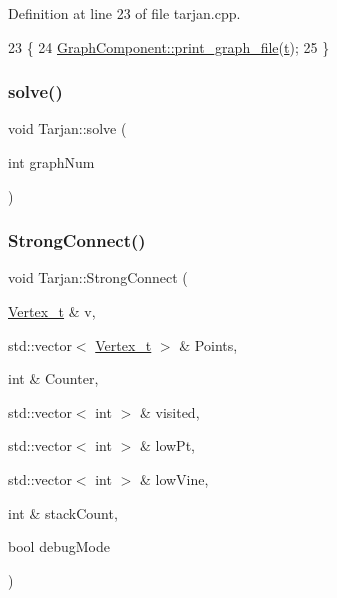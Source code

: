 Definition at line 23 of file tarjan.\+cpp.


\begin{DoxyCode}
23                         \{
24     \hyperlink{class_graph_component_a6af293dac3774fde0e2822b5725ecacd}{GraphComponent::print\_graph\_file}(\hyperlink{class_tarjan_a54b0703f885a3514ea0bf4cdbc7fdaad}{t});
25 \}
\end{DoxyCode}
\mbox{\label{class_tarjan_af94d48b6e78c292bd1aa465d37d89769}} 
\subsubsection{\texorpdfstring{solve()}{solve()}}
{\footnotesize\ttfamily void Tarjan\+::solve (\begin{DoxyParamCaption}\item[{int}]{graph\+Num }\end{DoxyParamCaption})}

\mbox{\label{class_tarjan_ac76fd1419a2de2dbf34c6ff1d4cc55e2}} 
\subsubsection{\texorpdfstring{Strong\+Connect()}{StrongConnect()}}
{\footnotesize\ttfamily void Tarjan\+::\+Strong\+Connect (\begin{DoxyParamCaption}\item[{\hyperlink{class_graph_component_ae67114a6ce5a001dc35e1996e1b45aa0}{Vertex\+\_\+t} \&}]{v,  }\item[{std\+::vector$<$ \hyperlink{class_graph_component_ae67114a6ce5a001dc35e1996e1b45aa0}{Vertex\+\_\+t} $>$ \&}]{Points,  }\item[{int \&}]{Counter,  }\item[{std\+::vector$<$ int $>$ \&}]{visited,  }\item[{std\+::vector$<$ int $>$ \&}]{low\+Pt,  }\item[{std\+::vector$<$ int $>$ \&}]{low\+Vine,  }\item[{int \&}]{stack\+Count,  }\item[{bool}]{debug\+Mode }\end{DoxyParamCaption})}



